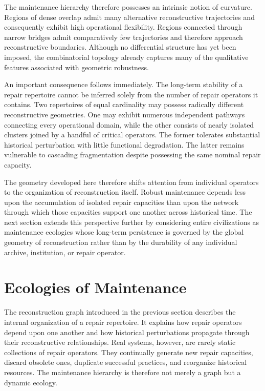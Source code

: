 \documentclass[12pt,oneside]{article}
\theoremstyle{plain}
\theoremstyle{definition}
\theoremstyle{remark}
\theoremstyle{plain}
\begin{document}
The maintenance hierarchy therefore possesses an intrinsic notion of curvature. Regions of dense
overlap admit many alternative reconstructive trajectories and consequently exhibit high operational
flexibility. Regions connected through narrow bridges admit comparatively few trajectories and
therefore approach reconstructive boundaries. Although no differential structure has yet been
imposed, the combinatorial topology already captures many of the qualitative features associated
with geometric robustness.

An important consequence follows immediately. The long-term stability of a repair repertoire
cannot be inferred solely from the number of repair operators it contains. Two repertoires of equal
cardinality may possess radically different reconstructive geometries. One may exhibit numerous
independent pathways connecting every operational domain, while the other consists of nearly
isolated clusters joined by a handful of critical operators. The former tolerates substantial
historical perturbation with little functional degradation. The latter remains vulnerable to
cascading fragmentation despite possessing the same nominal repair capacity.

The geometry developed here therefore shifts attention from individual operators to the organization
of reconstruction itself. Robust maintenance depends less upon the accumulation of isolated repair
capacities than upon the network through which those capacities support one another across historical
time. The next section extends this perspective further by considering entire civilizations as
maintenance ecologies whose long-term persistence is governed by the global geometry of
reconstruction rather than by the durability of any individual archive, institution, or repair
operator.

\section{Ecologies of Maintenance}

The reconstruction graph introduced in the previous section describes the internal organization of
a repair repertoire. It explains how repair operators depend upon one another and how historical
perturbations propagate through their reconstructive relationships. Real systems, however, are
rarely static collections of repair operators. They continually generate new repair capacities,
discard obsolete ones, duplicate successful practices, and reorganize historical resources. The
maintenance hierarchy is therefore not merely a graph but a dynamic ecology.
\end{document}
